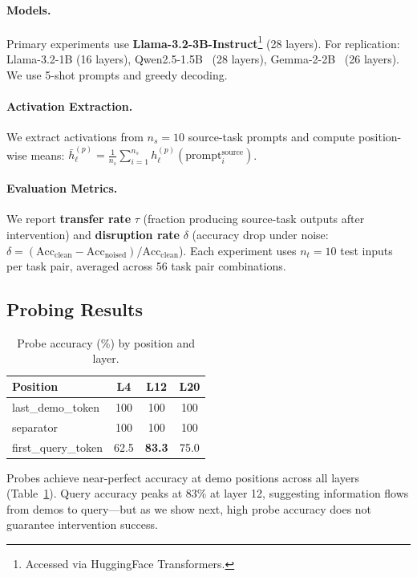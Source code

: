 \documentclass[runningheads]{llncs}
\begin{document}
\paragraph{Models.} Primary experiments use \textbf{Llama-3.2-3B-Instruct}\footnote{Accessed via HuggingFace Transformers.} (28 layers). For replication: Llama-3.2-1B (16 layers), Qwen2.5-1.5B~\cite{bai2023qwen} (28 layers), Gemma-2-2B~\cite{team2024gemma} (26 layers). We use 5-shot prompts and greedy decoding.

\paragraph{Activation Extraction.} We extract activations from $n_s = 10$ source-task prompts and compute position-wise means: $\bar{h}_\ell^{(p)} = \frac{1}{n_s} \sum_{i=1}^{n_s} h_\ell^{(p)}(\text{prompt}_i^{\text{source}})$.

\paragraph{Evaluation Metrics.} We report \textbf{transfer rate} $\tau$ (fraction producing source-task outputs after intervention) and \textbf{disruption rate} $\delta$ (accuracy drop under noise: $\delta = (\text{Acc}_{\text{clean}} - \text{Acc}_{\text{noised}}) / \text{Acc}_{\text{clean}}$). Each experiment uses $n_t = 10$ test inputs per task pair, averaged across 56 task pair combinations.

\subsection{Probing Results}

\begin{table}[t]
\centering
\caption{Probe accuracy (\%) by position and layer.}
\label{tab:probing}
\begin{tabular}{@{}lccc@{}}
\toprule
Position & L4 & L12 & L20 \\
\midrule
last\_demo\_token & 100 & 100 & 100 \\
separator & 100 & 100 & 100 \\
first\_query\_token & 62.5 & \textbf{83.3} & 75.0 \\
\bottomrule
\end{tabular}
\end{table}

Probes achieve near-perfect accuracy at demo positions across all layers (Table~\ref{tab:probing}). Query accuracy peaks at 83\% at layer 12, suggesting information flows from demos to query---but as we show next, high probe accuracy does not guarantee intervention success.
\end{document}
